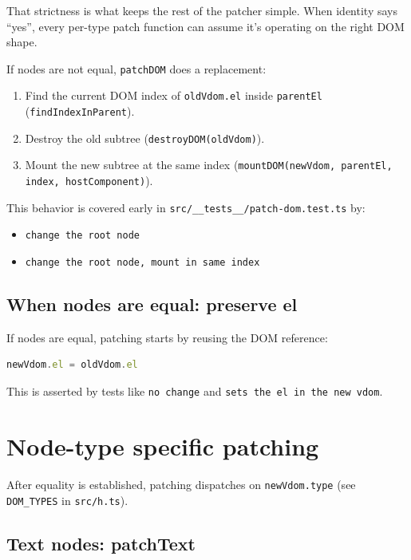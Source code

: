 That strictness is what keeps the rest of the patcher simple.
When identity says ``yes'', every per-type patch function can assume it's operating on the right DOM shape.

If nodes are not equal, \texttt{patchDOM} does a replacement:

\begin{enumerate}
  \item Find the current DOM index of \texttt{oldVdom.el} inside \texttt{parentEl} (\texttt{findIndexInParent}).
  \item Destroy the old subtree (\texttt{destroyDOM(oldVdom)}).
  \item Mount the new subtree at the same index (\texttt{mountDOM(newVdom, parentEl, index, hostComponent)}).
\end{enumerate}

This behavior is covered early in \texttt{src/\_\_tests\_\_/patch-dom.test.ts} by:

\begin{itemize}
  \item \texttt{change the root node}
  \item \texttt{change the root node, mount in same index}
\end{itemize}

\subsection{When nodes are equal: preserve el}

If nodes are equal, patching starts by reusing the DOM reference:

\begin{lstlisting}[language=JavaScript]
newVdom.el = oldVdom.el
\end{lstlisting}

This is asserted by tests like \texttt{no change} and \texttt{sets the el in the new vdom}.

\section{Node-type specific patching}

After equality is established, patching dispatches on \texttt{newVdom.type} (see \texttt{DOM\_TYPES} in \texttt{src/h.ts}).

\subsection{Text nodes: patchText}


